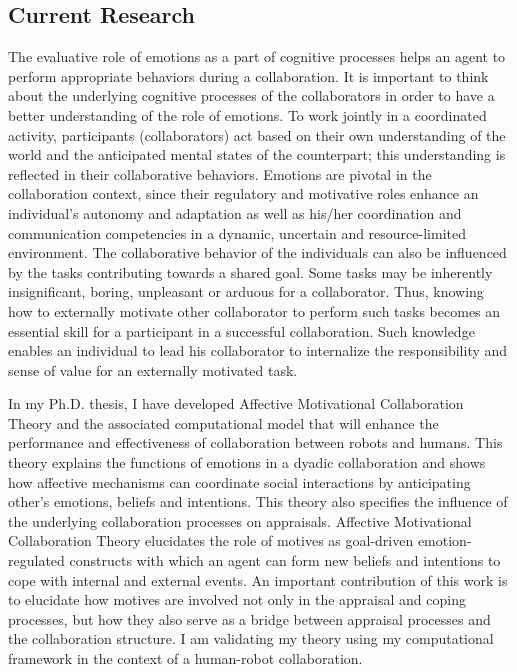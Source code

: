 \documentclass[a4paper, 11pt]{article}
\begin{document}
\begin{small}
\vspace*{-5mm}
\section*{Current Research}

The evaluative role of emotions as a part of cognitive processes helps an agent
to perform appropriate behaviors during a collaboration. It is important to
think about the underlying cognitive processes of the collaborators in order to
have a better understanding of the role of emotions. To work jointly in a
coordinated activity, participants (collaborators) act based on their own
understanding of the world and the anticipated mental states of the counterpart;
this understanding is reflected in their collaborative behaviors. Emotions are
pivotal in the collaboration context, since their regulatory and motivative
roles enhance an individual's autonomy and adaptation as well as his/her
coordination and communication competencies in a dynamic, uncertain and
resource-limited environment. The collaborative behavior of the individuals can
also be influenced by the tasks contributing towards a shared goal. Some tasks
may be inherently insignificant, boring, unpleasant or arduous for a
collaborator. Thus, knowing how to externally motivate other collaborator to
perform such tasks becomes an essential skill for a participant in a successful
collaboration. Such knowledge enables an individual to lead his collaborator to
internalize the responsibility and sense of value for an externally motivated
task.

In my Ph.D. thesis, I have developed Affective Motivational Collaboration Theory
and the associated computational model that will enhance the performance and
effectiveness of collaboration between robots and humans. This theory explains
the functions of emotions in a dyadic collaboration and shows how affective
mechanisms can coordinate social interactions by anticipating other's emotions,
beliefs and intentions. This theory also specifies the influence of the
underlying collaboration processes on appraisals. Affective Motivational
Collaboration Theory elucidates the role of motives as goal-driven
emotion-regulated constructs with which an agent can form new beliefs and
intentions to cope with internal and external events. An important contribution
of this work is to elucidate how motives are involved not only in the appraisal
and coping processes, but how they also serve as a bridge between appraisal
processes and the collaboration structure. I am validating my theory using my
computational framework in the context of a human-robot collaboration.


\end{small}
\end{document}
